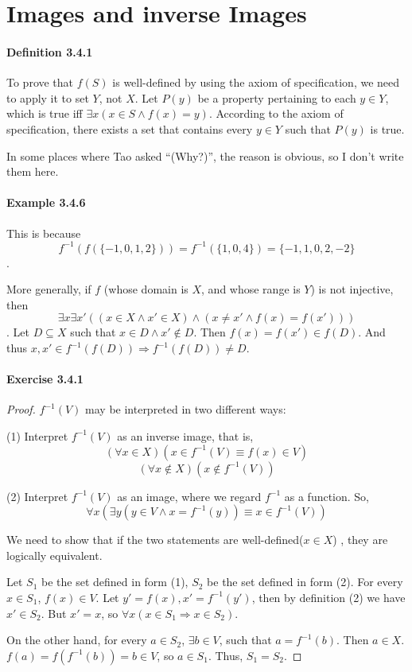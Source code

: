\section{Images and inverse Images}
\paragraph{Definition 3.4.1}
To prove that $f(S)$ is well-defined by using the axiom of specification, we need to apply it to set 
$Y$, not $X$. Let $P(y)$ be a property pertaining to each $y \in Y$, which is true iff 
$\exists x(x \in S \wedge f(x) = y)$. According to the axiom of specification, there exists a set that 
contains every $y \in Y$ such that $P(y)$ is true.

In some places where Tao asked ``(Why?)'', the reason is obvious, so I don't write them here. 

\paragraph{Example 3.4.6}
This is because 
\[
f^{-1}(f(\{-1,0,1,2\})) = f^{-1}(\{1,0,4\}) = \{-1,1,0,2,-2\}
\].

More generally, if $f$ (whose domain is $X$, and whose range is $Y$) is not injective, then 
\[
\exists x \exists x'((x \in X \wedge x' \in X) \wedge (x\neq x' \wedge f(x) = f(x')))
\]. 
Let $D \subseteq X$ such that $x \in D \wedge x' \notin D$. Then $f(x) = f(x') \in f(D)$. And thus 
$x,x' \in f^{-1}(f(D)) \Longrightarrow f^{-1}(f(D)) \neq D$. 

\paragraph{Exercise 3.4.1} \label{exercise3.4.1}
\begin{proof} 
$f^{-1}(V)$ may be interpreted in two different ways:

(1) Interpret $f^{-1}(V)$ as an inverse image, that is,
\[
(\forall x \in X)(x \in f^{-1}(V) \equiv f(x) \in V)
\]
\[
(\forall x \notin X)(x \notin f^{-1}(V))
\]

(2) Interpret $f^{-1}(V)$ as an image, where we regard $f^{-1}$ as a function. So, 
\[
\forall x(\exists y(y \in V \wedge x = f^{-1}(y)) \equiv x \in f^{-1}(V))
\]

We need to show that if the two statements are well-defined($x \in X$) , they are logically equivalent.

Let $S_1$ be the set defined in form (1), $S_2$ be the set defined in form (2). For every $x \in S_1$, 
$f(x) \in V$. Let $y' = f(x), x' = f^{-1}(y')$, then by definition (2) we have $x' \in S_2$. But 
$x' = x$, so $\forall x(x \in S_1 \Longrightarrow x \in S_2)$.

On the other hand, for every $a \in S_2$, $\exists b \in V$, such that $a = f^{-1}(b)$. Then $a \in X$. 
$f(a) = f(f^{-1}(b)) = b \in V$, so $a \in S_1$. Thus, $S_1 = S_2$.
\end{proof}

